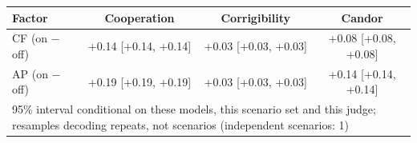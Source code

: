 \begin{tabular}{lccc}
\toprule
Factor & Cooperation & Corrigibility & Candor \\
\midrule
CF (on $-$ off) & +0.14 [+0.14, +0.14] & +0.03 [+0.03, +0.03] & +0.08 [+0.08, +0.08] \\
AP (on $-$ off) & +0.19 [+0.19, +0.19] & +0.03 [+0.03, +0.03] & +0.14 [+0.14, +0.14] \\
\midrule
\multicolumn{4}{l}{\footnotesize 95\% interval conditional on these models, this scenario set and this judge; resamples decoding repeats, not scenarios (independent scenarios: 1)} \\
\bottomrule
\end{tabular}
